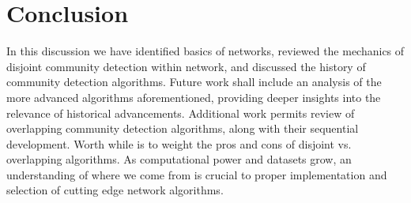 \documentclass[a4paper, 10pt, twocolumn]{article}
\begin{document}
\section{Conclusion}

In this discussion we have identified basics of networks, reviewed the mechanics of disjoint community detection within network, and discussed the history of community detection algorithms. 
Future work shall include an analysis of the more advanced algorithms aforementioned, providing deeper insights into the relevance of historical advancements. 
Additional work permits review of overlapping community detection algorithms, along with their sequential development. 
Worth while is to weight the pros and cons of disjoint vs. overlapping algorithms. 
As computational power and datasets grow, an understanding of where we come from is crucial to proper implementation and selection of cutting edge network algorithms.



{}
\end{document}
